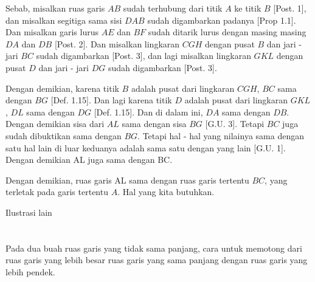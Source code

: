 \documentclass[a4paper, 12pt]{book}
\begin{document}
Sebab, misalkan ruas garis $AB$ sudah terhubung dari titik $A$ ke titik $B$
[Post. 1], dan misalkan segitiga sama sisi $DAB$ sudah digambarkan 
padanya [Prop 1.1]. Dan misalkan garis lurus $AE$ dan $BF$ sudah 
ditarik lurus dengan masing masing $DA$ dan $DB$ [Post. 2]. Dan
misalkan lingkaran $CGH$ dengan pusat $B$ dan jari - jari $BC$ sudah 
digambarkan [Post. 3], dan lagi misalkan lingkaran $GKL$ dengan pusat $D$
dan jari - jari $DG$ sudah digambarkan [Post. 3].  

Dengan demikian, karena titik $B$ adalah pusat dari lingkaran $CGH$, $BC$ sama 
dengan $BG$ [Def. 1.15].  Dan lagi karena titik $D$ adalah pusat dari 
lingkaran $GKL$, $DL$ sama dengan $DG$ [Def. 1.15]. Dan di dalam ini, $DA$
sama dengan $DB$. Dengan demikian sisa dari $AL$ sama dengan sisa $BG$
[G.U. 3]. Tetapi $BC$ juga sudah dibuktikan sama dengan $BG$. Tetapi hal - hal
yang nilainya sama dengan satu hal lain di luar keduanya adalah sama satu 
dengan yang lain [G.U. 1]. Dengan demikian AL juga sama dengan BC.

Dengan demikian, ruas garis AL sama dengan ruas garis tertentu
$BC$, yang terletak pada garis tertentu $A$. Hal yang kita butuhkan.  

Ilustrasi lain


\section*{\centering \thesection} 

Pada dua buah ruas garis yang tidak sama panjang, cara untuk
memotong dari ruas garis yang lebih besar ruas garis yang sama panjang dengan
ruas garis yang lebih pendek.
\end{document}
